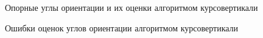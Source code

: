 \documentclass[14pt]{article}
\begin{document}
\begin{figure}
\noindent{}
\caption{Опорные углы ориентации и их оценки алгоритмом курсовертикали}
\label{fig:ahrs_angle}
\end{figure}

\begin{figure}
\noindent{}
\caption{Ошибки оценок углов ориентации алгоритмом курсовертикали}
\label{fig:ahrs_angle_errors}
\end{figure}
\end{document}
